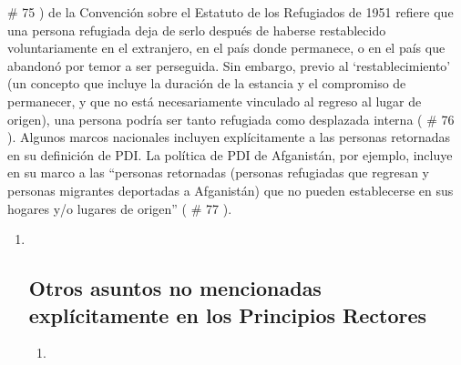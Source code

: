 \documentclass[
]{book}
\begin{document}
\begin{enumerate}
  \# 75
  ) de la Convención sobre el Estatuto de los Refugiados de 1951 refiere que una persona refugiada deja de serlo después de haberse restablecido voluntariamente en el extranjero, en el país donde permanece, o en el país que abandonó por temor a ser perseguida. Sin embargo, previo al `restablecimiento' (un concepto que incluye la duración de la estancia y el compromiso de permanecer, y que no está necesariamente vinculado al regreso al lugar de origen), una persona podría ser tanto refugiada como desplazada interna (
  \# 76
  ). Algunos marcos nacionales incluyen explícitamente a las personas retornadas en su definición de PDI. La política de PDI de Afganistán, por ejemplo, incluye en su marco a las ``personas retornadas (personas refugiadas que regresan y personas migrantes deportadas a Afganistán) que no pueden establecerse en sus hogares y/o lugares de origen'' (
  \# 77
  ).

  \begin{enumerate}
  \def\labelenumii{\arabic{enumii}.}
  \item ~
    \hypertarget{otros-asuntos-no-mencionadas-expluxedcitamente-en-los-principios-rectores}{%
    \subsection{Otros asuntos no mencionadas explícitamente en los Principios Rectores}\label{otros-asuntos-no-mencionadas-expluxedcitamente-en-los-principios-rectores}}

    \begin{enumerate}
    \def\labelenumiii{\arabic{enumiii}.}
    \item ~
      \hypertarget{duraciuxf3n-y-temporalidad-de-los-desplazamientos}{%
}
\end{enumerate}
\end{enumerate}
\end{enumerate}
\end{document}
